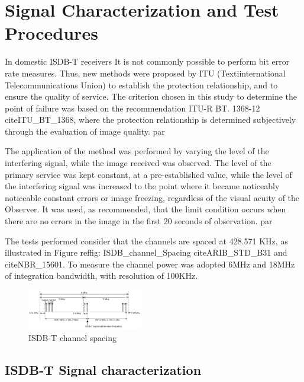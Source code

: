 \section {Signal Characterization and Test Procedures}

In domestic ISDB-T receivers It is not commonly possible to perform bit error rate measures. Thus, new methods were proposed by ITU (Texti{international Telecommunications Union}) to establish the protection relationship, and to ensure the quality of service. The criterion chosen in this study to determine the point of failure was based on the recommendation ITU-R BT. 1368-12 cite{ITU_BT_1368}, where the protection relationship is determined subjectively through the evaluation of image quality. par

The application of the method was performed by varying the level of the interfering signal, while the image received was observed. The level of the primary service was kept constant, at a pre-established value, while the level of the interfering signal was increased to the point where it became noticeably noticeable constant errors or image freezing, regardless of the visual acuity of the Observer. It was used, as recommended, that the limit condition occurs when there are no errors in the image in the first 20 seconds of observation. par

The tests performed consider that the channels are spaced at 428.571 KHz, as illustrated in Figure ref{fig: ISDB_channel_Spacing} cite{ARIB_STD_B31} and cite{NBR_15601}. To measure the channel power was adopted 6MHz and 18MHz of integration bandwidth, with resolution of 100KHz. \par

\begin{figure}[h!]
    \centering
    \includegraphics[width=0.45\textwidth]{Figures/Arib_ISDB_T_channel_Spacing}
    \caption{ISDB-T channel spacing}
    \label{fig:ISDB_channel_Spacing}
\end{figure}

\subsection{ISDB-T Signal characterization}

